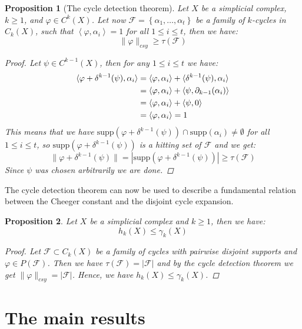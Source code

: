 \documentclass{article}
\newcommand{\supp}{\mathrm{supp}}
\newtheorem{prop}{Proposition}[section]
\begin{document}
\begin{prop}[The cycle detection theorem]\label{proposition1}
Let $X$ be a simplicial complex, $k\geq 1$, and $\varphi\in C^k(X)$. Let now $\mathcal{F}=\left\{\alpha_1,\ldots,\alpha_t\right\}$ be a family of $k$-cycles in $C_k(X)$, such that $\left\langle\varphi,\alpha_i\right\rangle=1$ for all $1\leq i\leq t$, then we have:
\[
\|\varphi\|_{csy}\geq\tau(\mathcal{F})
\]
\begin{proof}
Let $\psi\in C^{k-1}(X)$, then for any $1\leq i\leq t$ we have:
\begin{align}
\langle\varphi+\delta^{k-1}(\psi),\alpha_i\rangle&=\langle\varphi,\alpha_i\rangle+\langle\delta^{k-1}(\psi),\alpha_i\rangle\notag\\
&=\langle\varphi,\alpha_i\rangle+\langle\psi,\partial_{k-1}(\alpha_i)\rangle\notag\\
&=\langle\varphi,\alpha_i\rangle+\langle\psi,0\rangle\notag\\
&=\langle\varphi,\alpha_i\rangle=1\notag
\end{align}
This means that we have $\supp(\varphi+\delta^{k-1}(\psi))\cap \supp(\alpha_i)\neq\emptyset$ for all $1\leq i\leq t$, so $\supp(\varphi+\delta^{k-1}(\psi))$ is a hitting set of $\mathcal{F}$ and we get:
\[
\|\varphi+\delta^{k-1}(\psi)\|=|\supp(\varphi+\delta^{k-1}(\psi))|\geq\tau(\mathcal{F})
\]
Since $\psi$ was chosen arbitrarily we are done.
\end{proof}
\end{prop}

The cycle detection theorem can now be used to describe a fundamental relation between the Cheeger constant and the disjoint cycle expansion.

\begin{prop}\label{proposition2}
Let $X$ be a simplicial complex and $k\geq 1$, then we have:
\[
h_k(X)\leq\gamma_k(X)
\]
\begin{proof}
Let $\mathcal{F}\subset C_k(X)$ be a family of cycles with pairwise disjoint supports and $\varphi\in P(\mathcal{F})$. Then we have $\tau(\mathcal{F})=|\mathcal{F}|$ and by the cycle detection theorem we get $\|\varphi\|_{csy}=|\mathcal{F}|$. Hence, we have $h_k(X)\leq\gamma_k(X)$.
\end{proof}
\end{prop}

\section{The main results}
\end{document}

